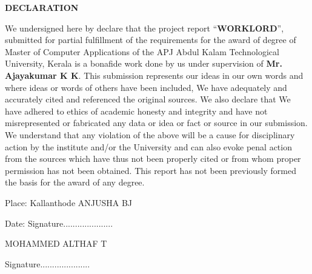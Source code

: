\documentclass[a4paper,12pt]{report}
\begin{document}
\pagebreak


{\centering \bf \large
	DECLARATION\par
}

\vspace*{20pt}
{\normalsize We undersigned here by declare that the project report “{\bf WORKLORD}”, submitted for partial fulfillment of the requirements for the award of degree of Master
	of Computer Applications of the APJ Abdul Kalam Technological University, Kerala is a bonafide
	work done by us under supervision of {\bf Mr. Ajayakumar K K}. This submission represents our ideas in our
	own words and where ideas or words of others have been included, We have adequately and accurately
	cited and referenced the original sources. We also declare that We have adhered to ethics of academic
	honesty and integrity and have not misrepresented or fabricated any data or idea or fact or source
	in our submission. We understand that any violation of the above will be a cause for disciplinary action
	by the institute and/or the University and can also evoke penal action from the sources which have
	thus not been properly cited or from whom proper permission has not been obtained. This report
	has not been previously formed the basis for the award of any degree. } \\


\begin{center}\vspace*{20pt}
	Place: Kallanthode    \hspace*{0pt} \hfill ANJUSHA BJ
\end{center}

\begin{center}\vspace*{10pt}
	Date:      \hspace*{0pt} \hfill Signature.....................
\end{center}

\begin{center}\vspace*{10pt}
	\hspace*{0pt} \hfill MOHAMMED ALTHAF T \\
\end{center}

\begin{center}\vspace*{10pt}
	\hspace*{0pt} \hfill Signature.....................
\end{center}

\end{document}
